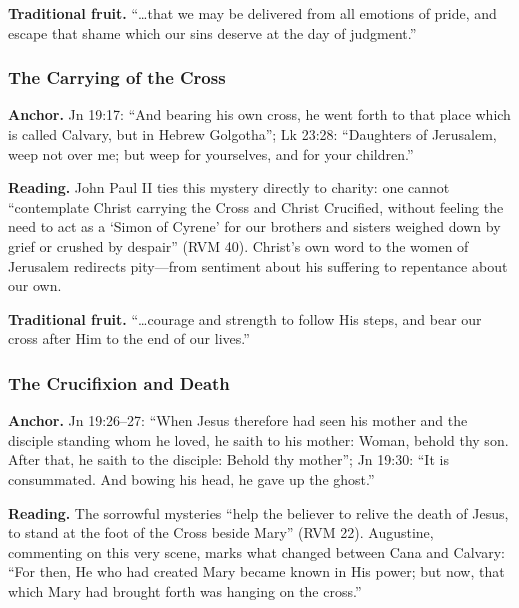 \textbf{Traditional fruit.} ``\ldots that we may be delivered from all
emotions of pride, and escape that shame which our sins deserve at the
day of judgment.''

\subsubsection{The Carrying of the Cross}

\textbf{Anchor.} Jn 19:17: ``And bearing his own cross, he went forth to
that place which is called Calvary, but in Hebrew Golgotha''; Lk 23:28:
``Daughters of Jerusalem, weep not over me; but weep for yourselves, and
for your children.''

\textbf{Reading.} John Paul II ties this mystery directly to charity:
one cannot ``contemplate Christ carrying the Cross and Christ
Crucified, without feeling the need to act as a `Simon of Cyrene' for
our brothers and sisters weighed down by grief or crushed by despair''
(RVM 40). Christ's own word to the women of Jerusalem redirects
pity---from sentiment about his suffering to repentance about our
own.

\textbf{Traditional fruit.} ``\ldots courage and strength to follow His
steps, and bear our cross after Him to the end of our lives.''

\subsubsection{The Crucifixion and Death}

\textbf{Anchor.} Jn 19:26--27: ``When Jesus therefore had seen his
mother and the disciple standing whom he loved, he saith to his mother:
Woman, behold thy son. After that, he saith to the disciple: Behold thy
mother''; Jn 19:30: ``It is consummated. And bowing his head, he gave up
the ghost.''

\textbf{Reading.} The sorrowful mysteries ``help the believer to relive
the death of Jesus, to stand at the foot of the Cross beside Mary''
(RVM 22). Augustine, commenting on this very scene, marks what changed
between Cana and Calvary: ``For then, He who had created Mary became
known in His power; but now, that which Mary had brought forth was
hanging on the cross.''

